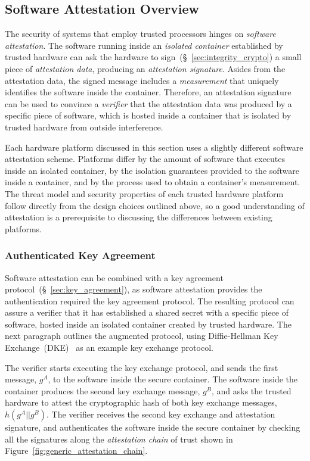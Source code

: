 \subsection{Software Attestation Overview}
\label{sec:generic_software_attestation}

The security of systems that employ trusted processors hinges on
\textit{software attestation}. The software running inside an \textit{isolated
container} established by trusted hardware can ask the hardware to
sign~(\S~\ref{sec:integrity_crypto}) a small piece of \textit{attestation
data}, producing an \textit{attestation signature}. Asides from the attestation
data, the signed message includes a \textit{measurement} that uniquely
identifies the software inside the container. Therefore, an attestation
signature can be used to convince a \textit{verifier} that the attestation data
was produced by a specific piece of software, which is hosted inside a
container that is isolated by trusted hardware from outside interference.

Each hardware platform discussed in this section uses a slightly different
software attestation scheme. Platforms differ by the amount of software that
executes inside an isolated container, by the isolation guarantees provided to
the software inside a container, and by the process used to obtain a
container's measurement. The threat model and security properties of each
trusted hardware platform follow directly from the design choices outlined
above, so a good understanding of attestation is a prerequisite to discussing
the differences between existing platforms.


\subsubsection{Authenticated Key Agreement}

Software attestation can be combined with a key agreement
protocol~(\S~\ref{sec:key_agreement}), as software attestation provides the
authentication required the key agreement protocol. The resulting protocol can
assure a verifier that it has established a shared secret with a specific piece
of software, hosted inside an isolated container created by trusted hardware.
The next paragraph outlines the augmented protocol, using Diffie-Hellman Key
Exchange~(DKE)~\cite{diffie1976keyexchange} as an example key exchange
protocol.

The verifier starts executing the key exchange protocol, and sends the first
message, $g^{A}$, to the software inside the secure container. The software
inside the container produces the second key exchange message, $g^{B}$, and
asks the trusted hardware to attest the cryptographic hash of both key exchange
messages, $h(g^{A} || g^{B})$. The verifier receives the second key exchange
and attestation signature, and authenticates the software inside the secure
container by checking all the signatures along the \textit{attestation chain}
of trust shown in Figure~\ref{fig:generic_attestation_chain}.

